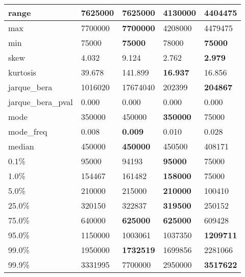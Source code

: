 \begin{table}[H]
\begin{tabular}{|l|m{10em}|m{10em}|m{10em}|m{10em}|}
\hline range & 7625000 & \bfseries 7625000 & \cellcolor[rgb]{0.9, 0.54, 0.52} 4130000 & 4404475 \\
\hline max & 7700000 & \bfseries 7700000 & \cellcolor[rgb]{0.9, 0.54, 0.52} 4208000 & 4479475 \\
\hline min & 75000 & \bfseries 75000 & \cellcolor[rgb]{0.9, 0.54, 0.52} 78000 & \bfseries 75000 \\
\hline skew & 4.032 & \cellcolor[rgb]{0.9, 0.54, 0.52} 9.124 & 2.762 & \bfseries 2.979 \\
\hline kurtosis & 39.678 & \cellcolor[rgb]{0.9, 0.54, 0.52} 141.899 & \bfseries 16.937 & 16.856 \\
\hline jarque\_bera & 1016020 & \cellcolor[rgb]{0.9, 0.54, 0.52} 17674040 & 202399 & \bfseries 204867 \\
\hline jarque\_bera\_pval & 0.000 & 0.000 & 0.000 & 0.000 \\
\hline mode & 350000 & 450000 & \bfseries 350000 & \cellcolor[rgb]{0.9, 0.54, 0.52} 75000 \\
\hline mode\_freq & 0.008 & \bfseries 0.009 & 0.010 & \cellcolor[rgb]{0.9, 0.54, 0.52} 0.028 \\
\hline median & 450000 & \bfseries 450000 & 450500 & \cellcolor[rgb]{0.9, 0.54, 0.52} 408171 \\
\hline 0.1\% & 95000 & 94193 & \bfseries 95000 & \cellcolor[rgb]{0.9, 0.54, 0.52} 75000 \\
\hline 1.0\% & 154467 & 161482 & \bfseries 158000 & \cellcolor[rgb]{0.9, 0.54, 0.52} 75000 \\
\hline 5.0\% & 210000 & 215000 & \bfseries 210000 & \cellcolor[rgb]{0.9, 0.54, 0.52} 100410 \\
\hline 25.0\% & 320150 & 322837 & \bfseries 319500 & \cellcolor[rgb]{0.9, 0.54, 0.52} 250152 \\
\hline 75.0\% & 640000 & \bfseries 625000 & \bfseries 625000 & \cellcolor[rgb]{0.9, 0.54, 0.52} 609428 \\
\hline 95.0\% & 1150000 & \cellcolor[rgb]{0.9, 0.54, 0.52} 1003061 & 1037350 & \bfseries 1209711 \\
\hline 99.0\% & 1950000 & \bfseries 1732519 & 1699856 & \cellcolor[rgb]{0.9, 0.54, 0.52} 2281066 \\
\hline 99.9\% & 3331995 & \cellcolor[rgb]{0.9, 0.54, 0.52} 7700000 & 2950000 & \bfseries 3517622 \\
\hline
\end{tabular}
\end{table}
